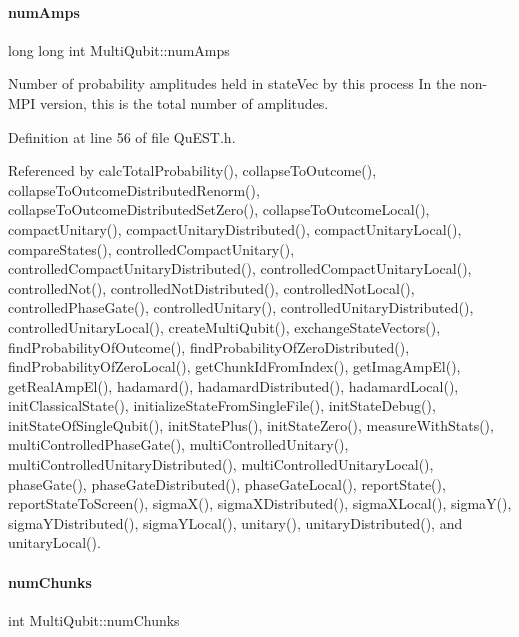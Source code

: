 \paragraph{\texorpdfstring{num\+Amps}{numAmps}}
{\footnotesize\ttfamily long long int Multi\+Qubit\+::num\+Amps}



Number of probability amplitudes held in state\+Vec by this process In the non-\/\+M\+PI version, this is the total number of amplitudes. 



Definition at line 56 of file Qu\+E\+S\+T.\+h.



Referenced by calc\+Total\+Probability(), collapse\+To\+Outcome(), collapse\+To\+Outcome\+Distributed\+Renorm(), collapse\+To\+Outcome\+Distributed\+Set\+Zero(), collapse\+To\+Outcome\+Local(), compact\+Unitary(), compact\+Unitary\+Distributed(), compact\+Unitary\+Local(), compare\+States(), controlled\+Compact\+Unitary(), controlled\+Compact\+Unitary\+Distributed(), controlled\+Compact\+Unitary\+Local(), controlled\+Not(), controlled\+Not\+Distributed(), controlled\+Not\+Local(), controlled\+Phase\+Gate(), controlled\+Unitary(), controlled\+Unitary\+Distributed(), controlled\+Unitary\+Local(), create\+Multi\+Qubit(), exchange\+State\+Vectors(), find\+Probability\+Of\+Outcome(), find\+Probability\+Of\+Zero\+Distributed(), find\+Probability\+Of\+Zero\+Local(), get\+Chunk\+Id\+From\+Index(), get\+Imag\+Amp\+El(), get\+Real\+Amp\+El(), hadamard(), hadamard\+Distributed(), hadamard\+Local(), init\+Classical\+State(), initialize\+State\+From\+Single\+File(), init\+State\+Debug(), init\+State\+Of\+Single\+Qubit(), init\+State\+Plus(), init\+State\+Zero(), measure\+With\+Stats(), multi\+Controlled\+Phase\+Gate(), multi\+Controlled\+Unitary(), multi\+Controlled\+Unitary\+Distributed(), multi\+Controlled\+Unitary\+Local(), phase\+Gate(), phase\+Gate\+Distributed(), phase\+Gate\+Local(), report\+State(), report\+State\+To\+Screen(), sigma\+X(), sigma\+X\+Distributed(), sigma\+X\+Local(), sigma\+Y(), sigma\+Y\+Distributed(), sigma\+Y\+Local(), unitary(), unitary\+Distributed(), and unitary\+Local().

\mbox{\label{structMultiQubit_acd43f2f57991709c9e94f73662c972b2}} 
\paragraph{\texorpdfstring{num\+Chunks}{numChunks}}
{\footnotesize\ttfamily int Multi\+Qubit\+::num\+Chunks}



